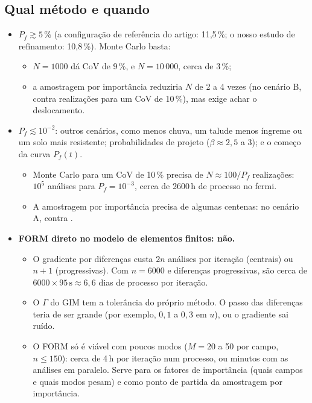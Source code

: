 \documentclass[11pt,a4paper]{article}
\begin{document}
\subsection{Qual método e quando}
\begin{itemize}
  \item \textbf{$P_f \gtrsim 5\,\%$} (a configuração de referência do artigo: 11,5\,\%; o nosso estudo de refinamento:
    10,8\,\%). Monte Carlo basta:
    \begin{itemize}
      \item $N = 1000$ dá CoV de 9\,\%, e $N = 10\,000$, cerca de 3\,\%;
      \item a amostragem por importância reduziria $N$ de 2 a 4 vezes (no cenário B, \pDoisBNisDez{} contra
        \pDoisBNmcDez{} realizações para um CoV de 10\,\%), mas exige achar o deslocamento.
    \end{itemize}
  \item \textbf{$P_f \lesssim 10^{-2}$}: outros cenários, como menos chuva, um talude menos íngreme ou um solo mais
    resistente; probabilidades de projeto ($\beta \approx 2{,}5$ a $3$); e o começo da curva $P_f(t)$.
    \begin{itemize}
      \item Monte Carlo para um CoV de 10\,\% precisa de $N \approx 100/P_f$ realizações: $10^5$ análises para
        $P_f = 10^{-3}$, cerca de 2600\,h de processo no fermi.
      \item A amostragem por importância precisa de algumas centenas: no cenário A, \pDoisANisDez{} contra
        \pDoisANmcDez{}.
    \end{itemize}
  \item \textbf{FORM direto no modelo de elementos finitos: não.}
    \begin{itemize}
      \item O gradiente por diferenças custa $2n$ análises por iteração (centrais) ou $n + 1$ (progressivas). Com
        $n = 6000$ e diferenças progressivas, são cerca de $6000 \times 95\,\mathrm{s} \approx 6{,}6$ dias de
        processo por iteração.
      \item O $\Gamma$ do GIM tem a tolerância do próprio método. O passo das diferenças teria de ser grande (por
        exemplo, $0{,}1$ a $0{,}3$ em $u$), ou o gradiente sai ruído.
      \item O FORM só é viável com poucos modos ($M = 20$ a 50 por campo, $n \leq 150$): cerca de 4\,h por iteração
        num processo, ou minutos com as análises em paralelo. Serve para os fatores de importância (quais campos e
        quais modos pesam) e como ponto de partida da amostragem por importância.
    \end{itemize}
\end{itemize}
\end{document}
